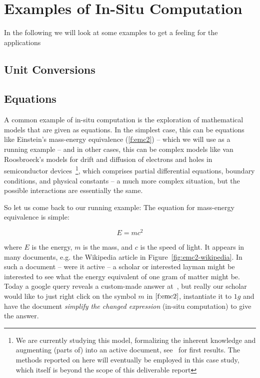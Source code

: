 \section{Examples of In-Situ Computation}\label{sec:examples}

In the following we will look at some examples to get a feeling for the applications
\subsection{Unit Conversions}\label{sec:units}

\subsection{Equations}\label{sec:equations}

A common example of in-situ computation is the exploration of mathematical models that are
given as equations. In the simplest case, this can be equations like Einstein's
mass-energy equivalence (\ref{f:emc2}) -- which we will use as a running example -- and in
other cases, this can be complex models like van Roosbroeck's models for drift and
diffusion of electrons and holes in semiconductor devices~\cite{Kopruckietal}\footnote{We
  are currently studying this model, formalizing the inherent knowledge and augmenting
  (parts of) \cite{Kopruckietal} into an active document, see~\cite{KohKopMueTab:RCS} for
  first results. The methods reported on here will eventually be employed in this case
  study, which itself is beyond the scope of this deliverable report}, which comprises
partial differential equations, boundary conditions, and physical constants -- a much more
complex situation, but the possible interactions are essentially the same. 

So let us come back to our running example: The equation for mass-energy equivalence is
simple:

\begin{equation}\label{f:emc2}
  E=mc^2
\end{equation}

where $E$ is the energy, $m$ is the mass, and $c$ is the speed of light. It appears in
many documents, e.g. the Wikipedia article in Figure~\ref{fig:emc2-wikipedia}. In such a
document -- were it active -- a scholar or interested layman might be interested to see
what the energy equivalent of one gram of matter might be. Today a google query reveals a
custom-made answer at~\cite{Odenwald:q388}, but really our scholar would like to just right
click on the symbol $m$ in $\ref{f:emc2}$, instantiate it to $1g$ and have the document
\emph{simplify the changed expression} (in-situ computation) to give the answer.

